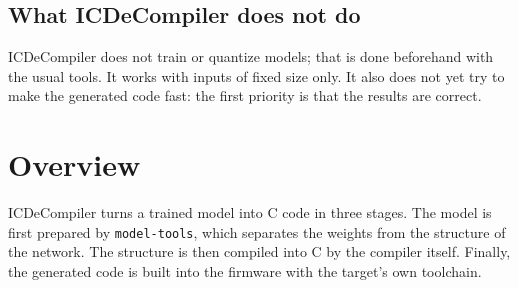 \documentclass[11pt,a4paper]{article}
\begin{document}
\subsection*{What ICDeCompiler does not do}

ICDeCompiler does not train or quantize models; that is done beforehand with
the usual tools. It works with inputs of fixed size only. It also does not yet
try to make the generated code fast: the first priority is that the results are
correct.

\section{Overview}

ICDeCompiler turns a trained model into C code in three stages. The model is
first prepared by \texttt{model-tools}, which separates the weights from the
structure of the network. The structure is then compiled into C by the
compiler itself. Finally, the generated code is built into the firmware with
the target's own toolchain.
\end{document}
